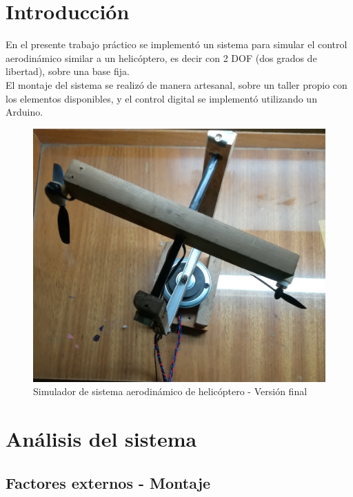 \documentclass{article}
\begin{document}
\newgeometry{} %




\tableofcontents
\newpage


\section{Introducción}

En el presente trabajo práctico se implementó un sistema para simular el control aerodinámico similar a un helicóptero, es decir con 2 DOF (dos grados de libertad), sobre una base fija.\\
El montaje del sistema se realizó de manera artesanal, sobre un taller propio con los elementos disponibles, y el control digital se implementó utilizando un Arduino.\\

\begin{figure}[H]
\centering
\includegraphics[width=0.7\linewidth]{images/modFinal2.jpg}
\caption{Simulador de sistema aerodinámico de helicóptero - Versión final}
\end{figure}

\newpage

\section{Análisis del sistema}
\subsection{Factores externos - Montaje}
\end{document}
